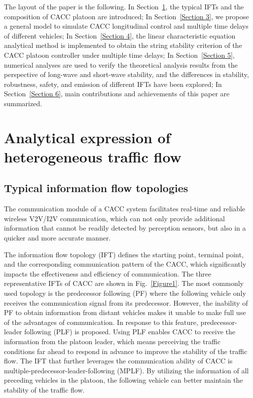 \documentclass[journal]{IEEEtran}
\begin{document}
The layout of the paper is the following. In Section~\ref{Section 2}, the typical IFTs and the composition of CACC platoon are introduced; In Section~\ref{Section 3}, we propose a general model to simulate CACC longitudinal control and multiple time delays of different vehicles; In Section~\ref{Section 4}, the linear characteristic equation analytical method is implemented to obtain the string stability criterion of the CACC platoon controller under multiple time delays; In Section~\ref{Section 5}, numerical analyses are used to verify the theoretical analysis results from the perspective of long-wave and short-wave stability, and the differences in stability, robustness, safety, and emission of different IFTs have been explored; In Section~\ref{Section 6}, main contributions and achievements of this paper are summarized. 

\section{Analytical expression of heterogeneous traffic flow}
\label{Section 2}
\subsection{Typical information flow topologies}
The communication module of a CACC system facilitates real-time and reliable wireless V2V/I2V communication, which can not only provide additional information that cannot be readily detected by perception sensors, but also in a quicker and more accurate manner.


The information flow topology (IFT) defines the starting point, terminal point, and the corresponding communication pattern of the CACC, which significantly impacts the effectiveness and efficiency of communication.\citep{zheng2015stability} The three representative IFTs of CACC are shown in Fig.~\ref{Figure1}. The most commonly used topology is the predecessor following (PF) where the following vehicle only receives the communication signal from its predecessor. However, the inability of PF to obtain information from distant vehicles makes it unable to make full use of the advantages of communication. In response to this feature, predecessor-leader following (PLF) is proposed. Using PLF enables CACC to receive the information from the platoon leader, which means perceiving the traffic conditions far ahead to respond in advance to improve the stability of the traffic flow. The IFT that further leverages the communication ability of CACC is multiple-predecessor-leader-following (MPLF).\citep{jia2015survey}\citep{ma2020stability} By utilizing the information of all preceding vehicles in the platoon, the following vehicle can better maintain the stability of the traffic flow.
\end{document}
